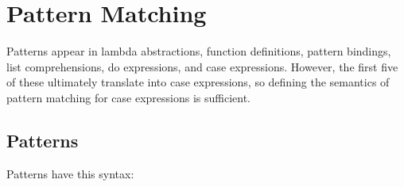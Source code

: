 \section{Pattern Matching} \label{patternmatch}

Patterns appear in lambda abstractions, function definitions, pattern bindings, list comprehensions, do expressions, and case expressions. However, the first five of these ultimately translate into case expressions, so defining the semantics of pattern matching for case expressions is sufficient.

\subsection{Patterns} \label{patterns}

Patterns have this syntax:

\begin{flushleft}
   
  \alt {}\\
  \sym{:} 
  \alt {}\\
   
  \alt {} \\
  
  \alt {}\\
     
    \alt {}        
    \alt {}
    \alt \sym{(}   \sym{)}
    \alt \sym{(} \sym{)}    
    \alt {}       
    \alt {}        
    \alt {}      \\

  
    \alt \regex{\_}         
    \alt {}  \sym{\{}   \sym{\}}
    \alt \sym{!}     \\

\end{flushleft}

